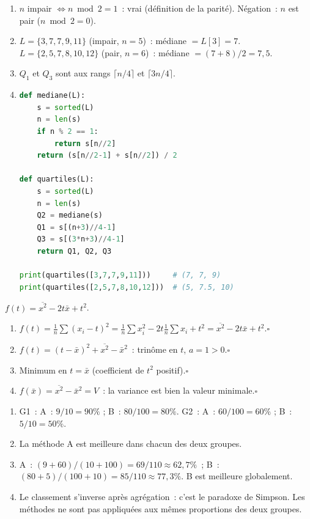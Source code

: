 
\begin{enumerate}
  \item $n$ impair $\Leftrightarrow n\bmod2=1$~: vrai (d\'efinition de la parit\'e).
        N\'egation~: $n$ est pair ($n\bmod2=0$).
  \item $L=\{3,7,7,9,11\}$ (impair, $n=5$)~: m\'ediane $= L[3]=7$.
        $L=\{2,5,7,8,10,12\}$ (pair, $n=6$)~: m\'ediane $=(7+8)/2=7{,}5$.
  \item $Q_1$ et $Q_3$ sont aux rangs $\lceil n/4\rceil$ et $\lceil3n/4\rceil$.
  \item
\begin{lstlisting}[language=Python]
def mediane(L):
    s = sorted(L)
    n = len(s)
    if n % 2 == 1:
        return s[n//2]
    return (s[n//2-1] + s[n//2]) / 2

def quartiles(L):
    s = sorted(L)
    n = len(s)
    Q2 = mediane(s)
    Q1 = s[(n+3)//4-1]
    Q3 = s[(3*n+3)//4-1]
    return Q1, Q2, Q3

print(quartiles([3,7,7,9,11]))     # (7, 7, 9)
print(quartiles([2,5,7,8,10,12]))  # (5, 7.5, 10)
\end{lstlisting}
\end{enumerate}


$f(t)=\overline{x^2}-2t\bar{x}+t^2$.
\begin{enumerate}
  \item $f(t)=\frac{1}{n}\sum(x_i-t)^2=\frac{1}{n}\sum x_i^2-2t\frac{1}{n}\sum x_i+t^2
        =\overline{x^2}-2t\bar{x}+t^2$.\hfill$\square$
  \item $f(t)=(t-\bar{x})^2+\overline{x^2}-\bar{x}^2$~: trin\^ome en $t$, $a=1>0$.\hfill$\square$
  \item Minimum en $t=\bar{x}$ (coefficient de $t^2$ positif).\hfill$\square$
  \item $f(\bar{x})=\overline{x^2}-\bar{x}^2=V$~: la variance est bien la valeur minimale.\hfill$\square$
\end{enumerate}


\begin{enumerate}
  \item G1~: A~: $9/10=90\%$ ; B~: $80/100=80\%$.
        G2~: A~: $60/100=60\%$ ; B~: $5/10=50\%$.
  \item La m\'ethode A est meilleure dans chacun des deux groupes.
  \item A~: $(9+60)/(10+100)=69/110\approx62{,}7\%$~;
        B~: $(80+5)/(100+10)=85/110\approx77{,}3\%$.
        B est meilleure globalement.
  \item Le classement s'inverse apr\`es agr\'egation~: c'est le paradoxe de Simpson.
        Les m\'ethodes ne sont pas appliqu\'ees aux m\^emes proportions des deux groupes.
\end{enumerate}

